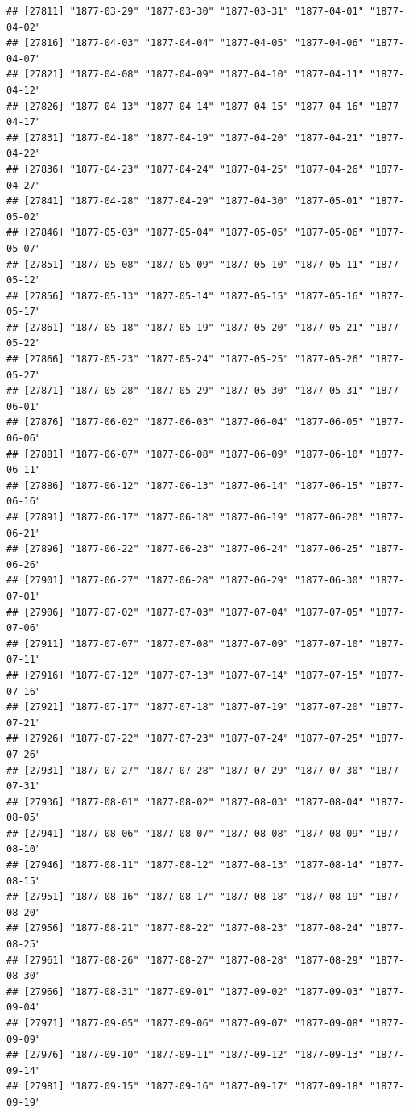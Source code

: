 \documentclass{article}\usepackage[]{graphicx}\usepackage[]{color}
\makeatletter
\newenvironment{kframe}{%
 \def\at@end@of@kframe{}%
 \ifinner\ifhmode%
  \def\at@end@of@kframe{\end{minipage}}%
  \begin{minipage}{\columnwidth}%
 \fi\fi%
 \def\FrameCommand##1{\hskip\@totalleftmargin \hskip-\fboxsep
 \colorbox{shadecolor}{##1}\hskip-\fboxsep
     \hskip-\linewidth \hskip-\@totalleftmargin \hskip\columnwidth}%
 \MakeFramed {\advance\hsize-\width
   \@totalleftmargin\z@ \linewidth\hsize
   \@setminipage}}%
 {\par\unskip\endMakeFramed%
 \at@end@of@kframe}
\newenvironment{knitrout}{}{} %
\makeatother
\begin{document}
\begin{description}
\begin{knitrout}
\begin{kframe}
\begin{verbatim}
## [27811] "1877-03-29" "1877-03-30" "1877-03-31" "1877-04-01" "1877-04-02"
## [27816] "1877-04-03" "1877-04-04" "1877-04-05" "1877-04-06" "1877-04-07"
## [27821] "1877-04-08" "1877-04-09" "1877-04-10" "1877-04-11" "1877-04-12"
## [27826] "1877-04-13" "1877-04-14" "1877-04-15" "1877-04-16" "1877-04-17"
## [27831] "1877-04-18" "1877-04-19" "1877-04-20" "1877-04-21" "1877-04-22"
## [27836] "1877-04-23" "1877-04-24" "1877-04-25" "1877-04-26" "1877-04-27"
## [27841] "1877-04-28" "1877-04-29" "1877-04-30" "1877-05-01" "1877-05-02"
## [27846] "1877-05-03" "1877-05-04" "1877-05-05" "1877-05-06" "1877-05-07"
## [27851] "1877-05-08" "1877-05-09" "1877-05-10" "1877-05-11" "1877-05-12"
## [27856] "1877-05-13" "1877-05-14" "1877-05-15" "1877-05-16" "1877-05-17"
## [27861] "1877-05-18" "1877-05-19" "1877-05-20" "1877-05-21" "1877-05-22"
## [27866] "1877-05-23" "1877-05-24" "1877-05-25" "1877-05-26" "1877-05-27"
## [27871] "1877-05-28" "1877-05-29" "1877-05-30" "1877-05-31" "1877-06-01"
## [27876] "1877-06-02" "1877-06-03" "1877-06-04" "1877-06-05" "1877-06-06"
## [27881] "1877-06-07" "1877-06-08" "1877-06-09" "1877-06-10" "1877-06-11"
## [27886] "1877-06-12" "1877-06-13" "1877-06-14" "1877-06-15" "1877-06-16"
## [27891] "1877-06-17" "1877-06-18" "1877-06-19" "1877-06-20" "1877-06-21"
## [27896] "1877-06-22" "1877-06-23" "1877-06-24" "1877-06-25" "1877-06-26"
## [27901] "1877-06-27" "1877-06-28" "1877-06-29" "1877-06-30" "1877-07-01"
## [27906] "1877-07-02" "1877-07-03" "1877-07-04" "1877-07-05" "1877-07-06"
## [27911] "1877-07-07" "1877-07-08" "1877-07-09" "1877-07-10" "1877-07-11"
## [27916] "1877-07-12" "1877-07-13" "1877-07-14" "1877-07-15" "1877-07-16"
## [27921] "1877-07-17" "1877-07-18" "1877-07-19" "1877-07-20" "1877-07-21"
## [27926] "1877-07-22" "1877-07-23" "1877-07-24" "1877-07-25" "1877-07-26"
## [27931] "1877-07-27" "1877-07-28" "1877-07-29" "1877-07-30" "1877-07-31"
## [27936] "1877-08-01" "1877-08-02" "1877-08-03" "1877-08-04" "1877-08-05"
## [27941] "1877-08-06" "1877-08-07" "1877-08-08" "1877-08-09" "1877-08-10"
## [27946] "1877-08-11" "1877-08-12" "1877-08-13" "1877-08-14" "1877-08-15"
## [27951] "1877-08-16" "1877-08-17" "1877-08-18" "1877-08-19" "1877-08-20"
## [27956] "1877-08-21" "1877-08-22" "1877-08-23" "1877-08-24" "1877-08-25"
## [27961] "1877-08-26" "1877-08-27" "1877-08-28" "1877-08-29" "1877-08-30"
## [27966] "1877-08-31" "1877-09-01" "1877-09-02" "1877-09-03" "1877-09-04"
## [27971] "1877-09-05" "1877-09-06" "1877-09-07" "1877-09-08" "1877-09-09"
## [27976] "1877-09-10" "1877-09-11" "1877-09-12" "1877-09-13" "1877-09-14"
## [27981] "1877-09-15" "1877-09-16" "1877-09-17" "1877-09-18" "1877-09-19"

\end{verbatim}
\end{kframe}
\end{knitrout}
\end{description}
\end{document}
